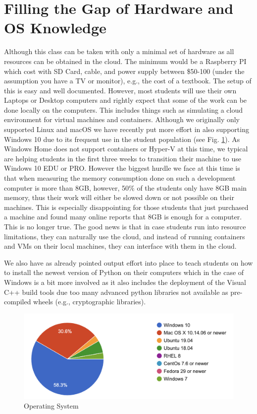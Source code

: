 \documentclass[conference]{IEEEtran}
\begin{document}
\section{Filling the Gap of Hardware and OS Knowledge}

Although this class can be taken with only a minimal set of hardware
as all resources can be obtained in the cloud. The minimum would be a
Raspberry PI which cost with SD Card, cable, and power supply between
\$50-100 (under the assumption you have a TV or monitor), e.g., the cost
of a textbook. The setup of this is easy and well
documented. However, most students will use their own Laptops or
Desktop computers and rightly expect that some of the work can be done
locally on the computers. This includes things such as simulating a
cloud environment for virtual machines and containers. Although we
originally only supported Linux and macOS we have recently put more
effort in also supporting Windows 10 due to its frequent use in the
student population (see Fig. \ref{fig:os}). As Windows Home does not support
containers or Hyper-V at this time, we typical are helping students
in the first three weeks to transition their machine to use Windows 10
EDU or PRO. However the biggest hurdle we face at this time is that
when measuring the memory consumption done on such a development
computer is more than 8GB, however, 50\% of the students only have  8GB
main memory, thus their work will either be slowed down or not
possible on their machines. This is especially disappointing for those
students that just purchased a machine and found many online reports
that 8GB is enough for a computer. This is no longer true. The good
news is that in case students run into resource limitations, they can
naturally use the cloud, and instead of running containers and VMs on
their local machines, they can interface with them in the cloud.

We also have as already pointed output effort into place to teach
students on how to install the newest version of Python on their
computers which in the case of Windows is  a bit more involved
as it also includes the deployment of the Visual C++ build tools due
too many advanced python libraries not available as pre-compiled wheels
(e.g., cryptographic libraries).

\begin{figure}[htb]
  \caption{Operating System}\label{fig:os}
  \centering
    \includegraphics[width=0.9\columnwidth]{images/os.png}

\end{figure}
\end{document}
